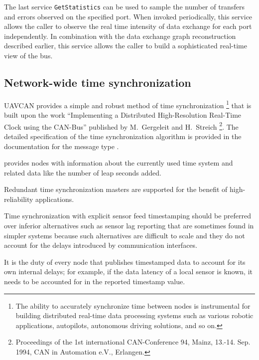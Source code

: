 The last service \verb|GetStatistics| can be used to sample the number of transfers and errors observed
on the specified port.
When invoked periodically, this service allows the caller to observe the real time intensity of data exchange
for each port independently.
In combination with the data exchange graph reconstruction described earlier,
this service allows the caller to build a sophisticated real-time view of the bus.


\subsection{Network-wide time synchronization}

UAVCAN provides a simple and robust method of time synchronization%
\footnote{The ability to accurately synchronize time between nodes is instrumental for building distributed
real-time data processing systems such as various robotic applications, autopilots, autonomous driving solutions,
and so on.} that is built upon the work
``Implementing a Distributed High-Resolution Real-Time Clock using the CAN-Bus''
published by M.~Gergeleit and H.~Streich%
\footnote{Proceedings of the 1st international CAN-Conference 94, Mainz,
13.-14. Sep. 1994, CAN in Automation e.V., Erlangen.}.
The detailed specification of the time synchronization algorithm is provided in the documentation
for the message type .

 provides nodes with information about
the currently used time system and related data like the number of leap seconds added.

Redundant time synchronization masters are supported for the benefit of high-reliability applications.

\begin{remark}
    Time synchronization with explicit sensor feed timestamping should be preferred over inferior alternatives
    such as sensor lag reporting that are sometimes found in simpler systems because such alternatives
    are difficult to scale and they do not account for the delays introduced by communication interfaces.

    It is the duty of every node that publishes timestamped data to account for its own internal delays;
    for example, if the data latency of a local sensor is known,
    it needs to be accounted for in the reported timestamp value.
\end{remark}

